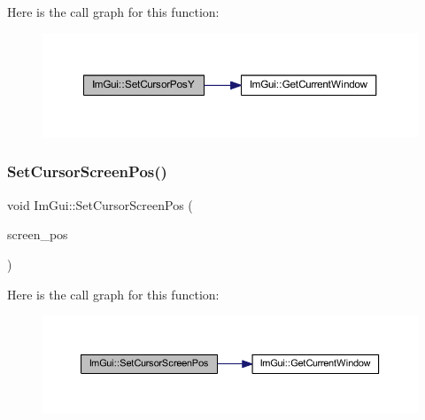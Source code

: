 Here is the call graph for this function\+:
\nopagebreak
\begin{figure}[H]
\begin{center}
\leavevmode
\includegraphics[width=350pt]{namespace_im_gui_a0174d351957d5c5677ebc214dd54f499_cgraph}
\end{center}
\end{figure}
\mbox{\label{namespace_im_gui_ab2f9a9014436bad2eadb8b01a42f6817}} 
\subsubsection{\texorpdfstring{Set\+Cursor\+Screen\+Pos()}{SetCursorScreenPos()}}
{\footnotesize\ttfamily void Im\+Gui\+::\+Set\+Cursor\+Screen\+Pos (\begin{DoxyParamCaption}\item[{const \mbox{\hyperlink{struct_im_vec2}{Im\+Vec2}} \&}]{screen\+\_\+pos }\end{DoxyParamCaption})}

Here is the call graph for this function\+:
\nopagebreak
\begin{figure}[H]
\begin{center}
\leavevmode
\includegraphics[width=350pt]{namespace_im_gui_ab2f9a9014436bad2eadb8b01a42f6817_cgraph}
\end{center}
\end{figure}
\mbox{\label{namespace_im_gui_adc77aecd872e578e347d8bc0dfcfa663}} 
